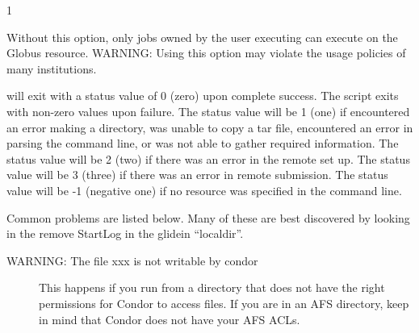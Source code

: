 \begin{ManPage}{\label{man-condor-glidein}}{1}
\begin{Options}
{	Without this option, only jobs owned by the user executing
	 can execute on the Globus resource. WARNING:
	Using this option may violate the usage policies of many
	institutions.
	}

\end{Options}

\ExitStatus

 will exit with a status value of 0 (zero) upon 
complete success.
The script exits with non-zero values upon failure.
The status value will be 1 (one) if 
 encountered an error making a directory,
was unable to copy a tar file,
encountered an error in parsing the command line,
or was not able to gather required information.
The status value will be 2 (two) if 
there was an error in the remote set up.
The status value will be 3 (three) if 
there was an error in remote submission.
The status value will be -1 (negative one) if 
no resource was specified in the command line.

Common problems are listed below.  Many of these are best discovered by
looking in the remove StartLog in the glidein ``localdir''.

\begin{description}

\item[WARNING: The file xxx is not writable by condor]  This happens if you
run  from a directory that does not have the right
permissions for Condor to access files.  If you are in an AFS directory,
keep in mind that Condor does not have your AFS ACLs.


\end{description}
\end{ManPage}
